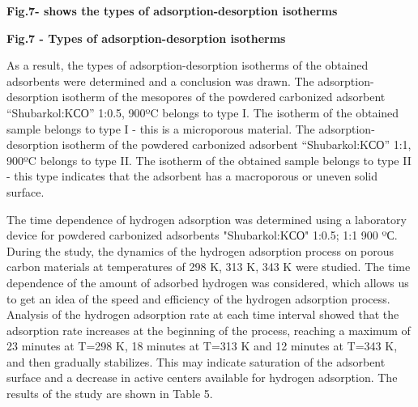 
{\bfseries Fig.7- shows the types of adsorption-desorption isotherms}


{\bfseries Fig.7 - Types of adsorption-desorption isotherms}

As a result, the types of adsorption-desorption isotherms of the
obtained adsorbents were determined and a conclusion was drawn. The
adsorption-desorption isotherm of the mesopores of the powdered
carbonized adsorbent ``Shubarkol:KСО''
1:0.5, 900ºC belongs to type I. The isotherm of the obtained sample
belongs to type I - this is a microporous material. The
adsorption-desorption isotherm of the powdered carbonized adsorbent
``Shubarkol:KСО'' 1:1, 900ºC belongs
to type II. The isotherm of the obtained sample belongs to type II -
this type indicates that the adsorbent has a macroporous or uneven solid
surface.

The time dependence of hydrogen adsorption was determined using a
laboratory device for powdered carbonized adsorbents
"Shubarkol:KСО" 1:0.5; 1:1 900 ºС.
During the study, the dynamics of the hydrogen adsorption process on
porous carbon materials at temperatures of 298 K, 313 K, 343 K were
studied. The time dependence of the amount of adsorbed hydrogen was
considered, which allows us to get an idea of
\hspace{0pt}\hspace{0pt}the speed and efficiency of the hydrogen
adsorption process. Analysis of the hydrogen adsorption rate at each
time interval showed that the adsorption rate increases at the beginning
of the process, reaching a maximum of 23 minutes at T=298 K, 18 minutes
at T=313 K and 12 minutes at T=343 K, and then gradually stabilizes.
This may indicate saturation of the adsorbent surface and a decrease in
active centers available for hydrogen adsorption. The results of the
study are shown in Table 5.

